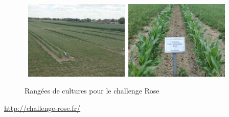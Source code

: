 \begin {figure}[!h]
\begin{center}
    \hbox{ 
    \includegraphics[width=5cm]{images/imageRang1.jpg}
    \hspace*{1cm}  %
    \includegraphics[width=5cm]{images/imageRang2.jpg}
  }
\caption{Rangées de cultures pour le challenge Rose}
\label{Rangées de cultures pour le challenge Rose}
\end{center}
\end {figure}

\url{http://challenge-rose.fr/}


